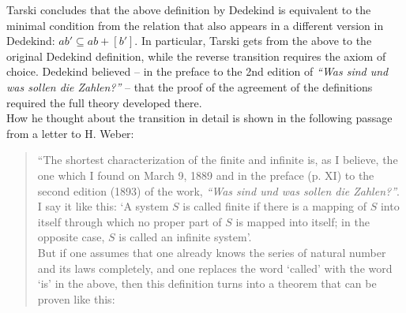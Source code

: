 \documentclass[leqno,hidelinks,10pt]{article}
\theoremstyle{definition}
\newcommand{\partof}{\subseteq}
\begin{document}
\begin{paracol}{2}
\begin{rightcolumn}
Tarski concludes that the above definition by Dedekind is equivalent to the
minimal condition from the relation that also appears in a different version in
Dedekind: $ab' \partof ab+[b']$. In particular, Tarski gets from the above to
the original Dedekind definition, while the reverse transition requires the axiom
of choice. Dedekind believed -- in the preface to the 2nd edition of
\emph{``Was sind und was sollen die Zahlen?''} -- that the proof of the agreement
of the definitions required the full theory developed there.
\ \\

How he thought about the transition in detail is shown in the following passage
from a letter to H. Weber:

\begin{quote}
``The shortest characterization of the finite and infinite is, as I believe, the
one which I found on March 9, 1889 and in the preface (p. XI) to the second edition
(1893) of the work, \emph{``Was sind und was sollen die Zahlen?''}. I say it like
this: `A system $S$ is called finite if there is a mapping of $S$ into itself
through which no proper part of $S$ is mapped into itself; in the opposite case,
$S$ is called an infinite system'.
\ \\


\hspace{12pt} But if one assumes that one already knows the series of natural
number and its laws completely, and
one replaces the word `called' with the word `is' in the above, then this definition
turns into a theorem that can be proven like this:


\end{quote}
\end{rightcolumn}
\end{paracol}
\end{document}
